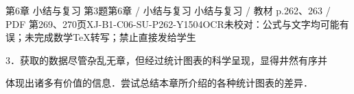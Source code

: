 \begin{bankitem}{第6章 小结与复习 第3题}{第6章 / 小结与复习 小结与复习 / 教材 p.262、263 / PDF 第269、270页}{XJ-B1-C06-SU-P262-Y1504}{OCR未校对：公式与文字均可能有误；未完成数学TeX转写；禁止直接发给学生}
\begin{ocrdraft}
\par
3．获取的数据尽管杂乱无章，但经过统计图表的科学呈现，显得井然有序并
\par
体现出诸多有价值的信息．尝试总结本章所介绍的各种统计图表的差异．
\par
[教材p.263 / PDF第270页]
\end{ocrdraft}
\end{bankitem}

